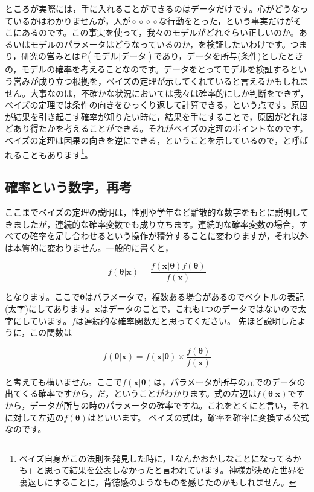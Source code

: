 \documentclass{ltjsbook}
\begin{document}
ところが実際には，手に入れることができるのはデータだけです。心がどうなっているかはわかりませんが，人が$\diamond\diamond\diamond\diamond$な行動をとった，という事実だけがそこにあるのです。この事実を使って，我々のモデルがどれぐらい正しいのか。あるいはモデルのパラメータはどうなっているのか，を検証したいわけです。つまり，研究の営みとは$P(\mbox{モデル}|\mbox{データ})$であり，データを所与(条件)としたときの，モデルの確率を考えることなのです。データをとってモデルを検証するという営みが成り立つ根拠を，ベイズの定理が示してくれていると言えるかもしれません。大事なのは，不確かな状況においては我々は確率的にしか判断をできず，ベイズの定理では条件の向きをひっくり返して計算できる，という点です。原因が結果を引き起こす確率が知りたい時に，結果を手にすることで，原因がどれほどあり得たかを考えることができる。それがベイズの定理のポイントなのです。ベイズの定理は因果の向きを逆にできる，ということを示しているので，と呼ばれることもあります\footnote{ベイズ自身がこの法則を発見した時に，「なんかおかしなことになってるかも」と思って結果を公表しなかったと言われています。神様が決めた世界を裏返しにすることに，背徳感のようなものを感じたのかもしれません。}。

\subsection{確率という数字，再考}
ここまでベイズの定理の説明は，性別や学年など離散的な数字をもとに説明してきましたが，連続的な確率変数でも成り立ちます。連続的な確率変数の場合，すべての確率を足し合わせるという操作が積分することに変わりますが，それ以外は本質的に変わりません。一般的に書くと，

\[ f(\bm{\theta}|\bm{x}) = \frac{f(\bm{x}|\bm{\theta})f(\bm{\theta})}{f(\bm{x})} \]

となります。ここで$\bm{\theta}$はパラメータで，複数ある場合があるのでベクトルの表記(太字)にしてあります。$\bm{x}$はデータのことで，これも1つのデータではないので太字にしています。$f$は連続的な確率関数だと思ってください。
先ほど説明したように，この関数は

\[ f(\bm{\theta}|\bm{x}) = f(\bm{x}|\bm{\theta}) \times \frac{f(\bm{\theta})}{f(\bm{x})} \]

と考えても構いません。ここで$f(\bm{x}|\bm{\theta})$は，パラメータが所与の元でのデータの出てくる確率ですから，だ，ということがわかります。式の左辺は$ f(\bm{\theta}|\bm{x})$ですから，データが所与の時のパラメータの確率ですね。これをとくにと言い，それに対して左辺の$f(\bm{\theta})$はといいます。
ベイズの式は，確率を確率に変換する公式なのです。
\end{document}
